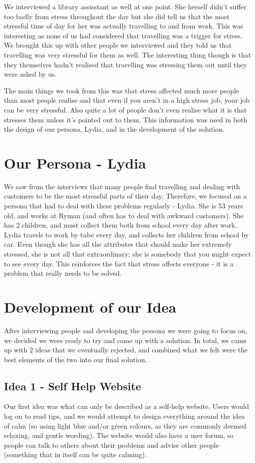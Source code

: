 \documentclass{scrartcl}
\begin{document}
We interviewed a library assisstant as well at one point. She 
herself didn't suffer too badly from stress throughout the day
but she did tell us that the most stressful time of day for her was
actually travelling to and from work. This was interesting as
none of us had considered that travelling was a trigger for stress.
We brought this up with other people we interviewed and they told
us that travelling was very stressful for them as well. The
interesting thing though is that they themselves hadn't realised
that travelling was stressing them out until they were asked by
us.

The main things we took from this was that stress affected much
more people than most people realise and that even if you aren't
in a high stress job, your job can be very stressful. Also 
quite a lot of people don't even realise what it is that stresses
them unless it's pointed out to them. This information was used
in both the design of our persona, Lydia, and in the development 
of the solution.

\section{Our Persona - Lydia}
We saw from the interviews that many people find travelling and dealing with customers to be the most stressful parts of their day.
Therefore, we focused on a persona that had to deal with these problems regularly - Lydia. She is 53 years old, and works at Ryman
(and often has to deal with awkward customers). She has 2 children, and must collect them both from school every day after work.
Lydia travels to work by tube every day, and collects her children from school by car. Even though she has all the attributes that
should make her extremely stressed, she is not all that extraordinary; she is somebody that you might expect to see every day. This
reinforces the fact that stress affects everyone - it is a problem that really needs to be solved.

\section{Development of our Idea}
After interviewing people and developing the persona we were going to focus on, we decided we were ready to try and come up with
a solution. In total, we came up with 2 ideas that we eventually rejected, and combined what we felt were the best elements
of the two into our final solution.

\subsection{Idea 1 - Self Help Website}
Our first idea was what can only be described as a self-help website. Users would log on to read tips, and we would attempt to
design everything around the idea of calm (so using light blue and/or green colours, as they are commonly deemed relaxing,
and gentle wording). The website would also have a user forum, so people can talk to others about their problems and advise
other people (something that in itself can be quite calming).
\end{document}
